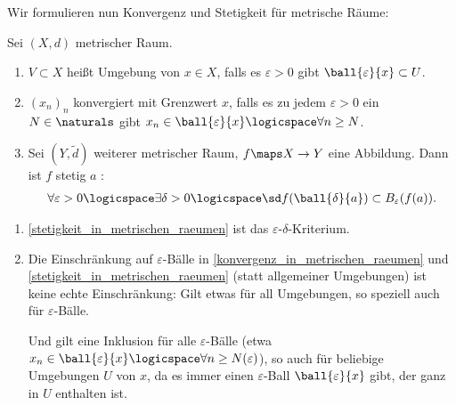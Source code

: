 Wir formulieren nun Konvergenz und Stetigkeit für metrische Räume:
\begin{bemerkungen}
    Sei \( (X,d) \) metrischer Raum.
    \begin{enumerate}
        \item[\thref{umgebung_in_topologischen_raeumen}]\label{umgebung_in_metrischen_raeumen} \( V\subset X \) heißt Umgebung von \( x\in X \), falls es \( \varepsilon >0 \) gibt \sd \( \ball{\varepsilon}{x}\subset U \).
        \item[\thref{konvergenz_in_topologischen_raeumen}]\label{konvergenz_in_metrischen_raeumen} \( (x_n)_n \) konvergiert mit Grenzwert \( x \), falls es zu jedem \( \varepsilon>0 \) ein \( N\in \naturals \) gibt \sd \( x_n\in \ball{\varepsilon}{x}\logicspace\forall n\geq N \).
        \item[\thref{stetigkeit_in_topologischen_raeumen}]\label{stetigkeit_in_metrischen_raeumen} Sei \( (Y,\tilde{d}) \) weiterer metrischer Raum, \( f\maps X \to Y \) eine Abbildung. Dann ist \( f \) stetig \( a \) \gdw:
        \begin{align*}
            \forall\varepsilon>0\logicspace\exists \delta>0\logicspace\text{\sd} f(\ball{\delta}{a})\subset B_\varepsilon(f(a)).
        \end{align*}
    \end{enumerate}
\end{bemerkungen}
\begin{bemerkungen*}
    \begin{enumerate}
        \item \ref{stetigkeit_in_metrischen_raeumen} ist das \( \varepsilon \)-\( \delta \)-Kriterium.
        \item Die Einschränkung auf \( \varepsilon \)-Bälle in \ref{konvergenz_in_metrischen_raeumen} und \ref{stetigkeit_in_metrischen_raeumen} (statt allgemeiner Umgebungen) ist keine echte Einschränkung: Gilt etwas für all Umgebungen, so speziell auch für \( \varepsilon \)-Bälle.
        
        Und gilt eine Inklusion für alle \( \varepsilon \)-Bälle (etwa \( x_n\in \ball{\varepsilon}{x}\logicspace\forall n \geq N(\varepsilon) \)), so auch für beliebige Umgebungen \( U \) von \( x \), da es immer einen \( \varepsilon \)-Ball \( \ball{\varepsilon}{x} \) gibt, der ganz in \( U \) enthalten ist.
    \end{enumerate}
\end{bemerkungen*}
